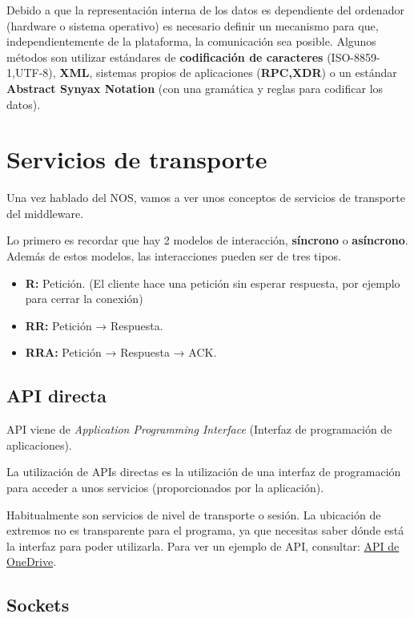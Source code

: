 Debido a que la representación interna de los datos es dependiente del ordenador (hardware o sistema operativo) es necesario definir un mecanismo para que, independientemente de la plataforma, la comunicación sea posible. Algunos métodos son utilizar estándares de \textbf{codificación de caracteres} (ISO-8859-1,UTF-8), \textbf{XML}, sistemas propios de aplicaciones (\textbf{RPC,XDR}) o un estándar \textbf{Abstract Synyax Notation} (con una gramática y reglas para codificar los datos).


\section{Servicios de transporte}

Una vez hablado del NOS, vamos a ver unos conceptos de  servicios de transporte del middleware.

Lo primero es recordar que hay 2 modelos de interacción, \textbf{síncrono} o \textbf{asíncrono}. Además de estos modelos, las interacciones pueden ser de tres tipos.
\begin{itemize}
	\item \textbf{R:} Petición. (El cliente hace una petición sin esperar respuesta, por ejemplo para cerrar la conexión)
	\item \textbf{RR:} Petición → Respuesta.
	\item \textbf{RRA:} Petición → Respuesta → ACK.
\end{itemize}

\subsection{API directa}

\begin{defn}
API viene de \textit{Application Programming Interface} (Interfaz de programación de aplicaciones).

La utilización de APIs directas es la utilización de una interfaz de programación para acceder a unos servicios (proporcionados por la aplicación).
\end{defn}

Habitualmente son servicios de nivel de transporte o sesión. La ubicación de extremos no es transparente para el programa, ya que necesitas saber dónde está la interfaz para poder utilizarla. Para ver un ejemplo de API, consultar: \href{https://apigee.com/OneDrive/embed/console/OneDrive}{API de OneDrive}.

\subsection{Sockets}


